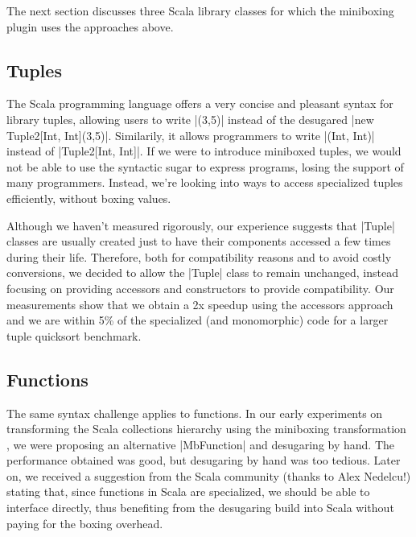 The next section discusses three Scala library classes for which the miniboxing plugin uses the approaches above.

\subsection{Tuples}

The Scala programming language offers a very concise and pleasant syntax for library tuples, allowing users to write |(3,5)| instead of the desugared |new Tuple2[Int, Int](3,5)|. Similarily, it allows programmers to write |(Int, Int)| instead of |Tuple2[Int, Int]|. If we were to introduce miniboxed tuples, we would not be able to use the syntactic sugar to express programs, losing the support of many programmers. Instead, we're looking into ways to access specialized tuples efficiently, without boxing values.

Although we haven't measured rigorously, our experience suggests that |Tuple| classes are usually created just to have their components accessed a few times during their life. Therefore, both for compatibility reasons and to avoid costly conversions, we decided to allow the |Tuple| class to remain unchanged, instead focusing on providing accessors and constructors to provide compatibility.
Our measurements show that we obtain a 2x speedup using the accessors approach and we are within 5\% of the specialized (and monomorphic) code for a larger tuple quicksort benchmark.

\subsection{Functions}

The same syntax challenge applies to functions. In our early experiments on transforming the Scala collections hierarchy using the miniboxing transformation \cite{miniboxing-linkedlist}, we were proposing an alternative |MbFunction| and desugaring by hand. The performance obtained was good, but desugaring by hand was too tedious. Later on, we received a suggestion from the Scala community (thanks to Alex Nedelcu!) stating that, since functions in Scala are specialized, we should be able to interface directly, thus benefiting from the desugaring build into Scala without paying for the boxing overhead.

